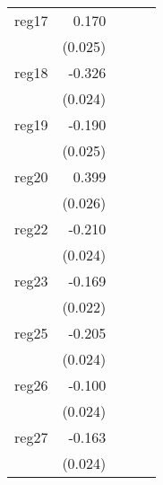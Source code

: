 {\begin{longtable}{l*{4}{D{.}{.}{-1}}}
\addlinespace
reg17       &       0.170\sym{***}&                     &                     &                     \\
            &     (0.025)         &                     &                     &                     \\
\addlinespace
reg18       &      -0.326\sym{***}&                     &                     &                     \\
            &     (0.024)         &                     &                     &                     \\
\addlinespace
reg19       &      -0.190\sym{***}&                     &                     &                     \\
            &     (0.025)         &                     &                     &                     \\
\addlinespace
reg20       &       0.399\sym{***}&                     &                     &                     \\
            &     (0.026)         &                     &                     &                     \\
\addlinespace
reg22       &      -0.210\sym{***}&                     &                     &                     \\
            &     (0.024)         &                     &                     &                     \\
\addlinespace
reg23       &      -0.169\sym{***}&                     &                     &                     \\
            &     (0.022)         &                     &                     &                     \\
\addlinespace
reg25       &      -0.205\sym{***}&                     &                     &                     \\
            &     (0.024)         &                     &                     &                     \\
\addlinespace
reg26       &      -0.100\sym{***}&                     &                     &                     \\
            &     (0.024)         &                     &                     &                     \\
\addlinespace
reg27       &      -0.163\sym{***}&                     &                     &                     \\
            &     (0.024)         &                     &                     &                     \\

\end{longtable}}
